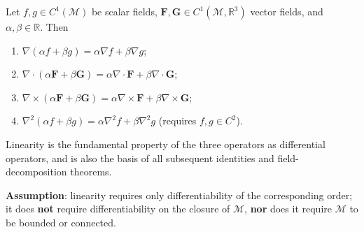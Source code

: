 \begin{proposition}\label{prop:operator_linearity}
Let $f, g \in C^1(\mathcal{M})$ be scalar fields, $\mathbf{F}, \mathbf{G} \in C^1(\mathcal{M}, \mathbb{R}^3)$ vector fields, and $\alpha, \beta \in \mathbb{R}$. Then
\begin{enumerate}[label=(\roman*)]
    \item $\nabla(\alpha f + \beta g) = \alpha \nabla f + \beta \nabla g$;
    \item $\nabla \cdot (\alpha \mathbf{F} + \beta \mathbf{G}) = \alpha \nabla \cdot \mathbf{F} + \beta \nabla \cdot \mathbf{G}$;
    \item $\nabla \times (\alpha \mathbf{F} + \beta \mathbf{G}) = \alpha \nabla \times \mathbf{F} + \beta \nabla \times \mathbf{G}$;
    \item $\nabla^2(\alpha f+\beta g) = \alpha\nabla^2 f+\beta\nabla^2 g$ (requires $f,g\in C^2$).
\end{enumerate}
Linearity is the fundamental property of the three operators as differential operators, and is also the basis of all subsequent identities and field-decomposition theorems.

\textbf{Assumption}: linearity requires only differentiability of the corresponding order; it does \textbf{not} require differentiability on the closure of $\mathcal M$, \textbf{nor} does it require $\mathcal M$ to be bounded or connected.
\end{proposition}

